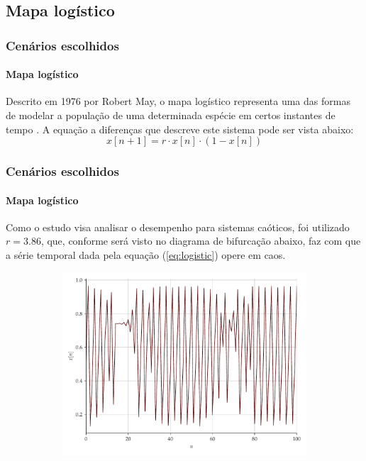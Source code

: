 \documentclass{beamer}
\begin{document}
\subsection{Mapa logístico}
\begin{frame}
	\frametitle{Cenários escolhidos}
	\framesubtitle{Mapa logístico}
	\justifying Descrito em 1976 por Robert May, o mapa logístico representa uma das formas de modelar a população de uma determinada espécie em certos instantes de tempo \cite{may1976simple}. A equação a diferenças que descreve este sistema pode ser vista abaixo:
\begin{equation}\label{eq:logistic}
x[n+1] = r\cdot x[n] \cdot (1 - x[n])
\end{equation}
\end{frame}

\begin{frame}
	\frametitle{Cenários escolhidos}
	\framesubtitle{Mapa logístico}
\justifying Como o estudo visa analisar o desempenho para sistemas caóticos, foi utilizado $r=3.86$, que, conforme será visto no diagrama de bifurcação abaixo, faz com que a série temporal dada pela equação (\ref{eq:logistic}) opere em caos.
\begin{figure}[H]
     \begin{subfigure}[t]{0.3\textwidth} 
         \includegraphics[scale=0.2]{serie-logistico.pdf}
     \end{subfigure}
     \centering
     \begin{subfigure}[t]{0.3\textwidth} 

\end{subfigure}
\end{figure}
\end{frame}
\end{document}
